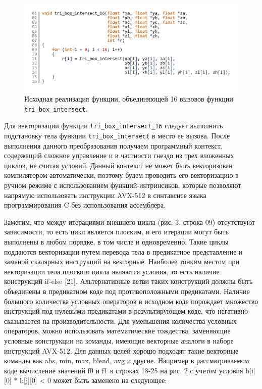 \begin{figure}[ht]
	\centering
		\includegraphics[width=1.0\textwidth]{./pics/text_4_mesh_intersect/pic_tri_intersect_16_orig.pdf}
	\caption{Исходная реализация функции, объединяющей 16 вызовов функции \texttt{tri\_box\_intersect}.}
	\label{fig:text_1_mesh_intersect_tri16}
\end{figure}

Для векторизации функции \texttt{tri\_box\_intersect\_16} следует выполнить подстановку тела функции \texttt{tri\_box\_intersect} в место ее вызова.
После выполнения данного преобразования получаем программный контекст, содержащий сложное управление и в частности гнездо из трех вложенных циклов, не считая условий.
Данный контекст не может быть векторизован компилятором автоматически, поэтому будем проводить его векторизацию в ручном режиме с использованием функций-интринсиков, которые позволяют напрямую использовать инструкции AVX-512 в синтаксисе языка программирования C без использования ассемблера.

Заметим, что между итерациями внешнего цикла (рис. 3, строка 09) отсутствуют зависимости, то есть цикл является плоским, и его итерации могут быть выполнены в любом порядке, в том числе и одновременно.
Такие циклы поддаются векторизации путем перевода тела в предикатное представление и заменой скалярных инструкций на векторные.
Наиболее тонким местом при векторизации тела плоского цикла являются условия, то есть наличие конструкций if-else [21].
Альтернативные ветви таких конструкций должны быть объединены в предикатном коде под противоположными предикатами.
Наличие большого количества условных операторов в исходном коде порождает множество инструкций под нулевыми предикатами в результирующем коде, что негативно сказывается на производительности.
Для уменьшения количества условных операторов, можно использовать математические тождества, заменяющие условные конструкции на команды, имеющие векторные аналоги в наборе инструкций AVX-512.
Для данных целей хорошо подходят такие векторные команды как abs, min, max, blend, avg и другие.
Например в рассматриваемом коде вычисление значений f0 и f1 в строках 18-25 на рис. 2 с учетом условия b[i][0] * b[j][0] < 0 может быть заменено на следующее:

